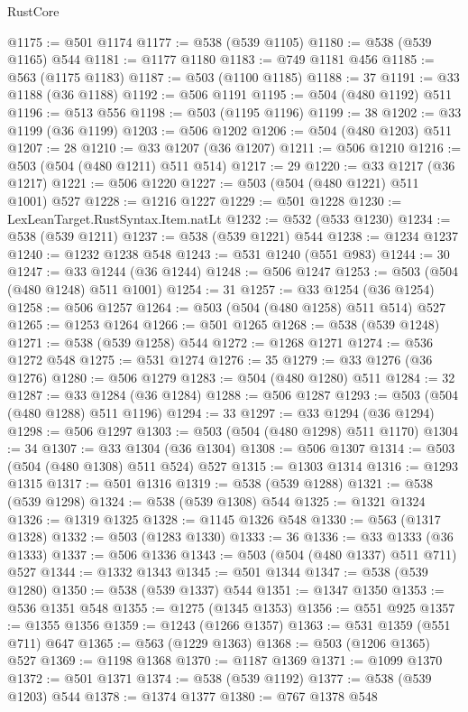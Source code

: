 \begin{lexlean}{RustCore}
\begin{coremodule}
@1175 := @501 @1174
@1177 := @538 (@539 @1105)
@1180 := @538 (@539 @1165) @544
@1181 := @1177 @1180
@1183 := @749 @1181 @456
@1185 := @563 (@1175 @1183)
@1187 := @503 (@1100 @1185)
@1188 := 37
@1191 := @33 @1188 (@36 @1188)
@1192 := @506 @1191
@1195 := @504 (@480 @1192) @511
@1196 := @513 @556
@1198 := @503 (@1195 @1196)
@1199 := 38
@1202 := @33 @1199 (@36 @1199)
@1203 := @506 @1202
@1206 := @504 (@480 @1203) @511
@1207 := 28
@1210 := @33 @1207 (@36 @1207)
@1211 := @506 @1210
@1216 := @503 (@504 (@480 @1211) @511 @514)
@1217 := 29
@1220 := @33 @1217 (@36 @1217)
@1221 := @506 @1220
@1227 := @503 (@504 (@480 @1221) @511 @1001) @527
@1228 := @1216 @1227
@1229 := @501 @1228
@1230 := LexLeanTarget.RustSyntax.Item.natLt
@1232 := @532 (@533 @1230)
@1234 := @538 (@539 @1211)
@1237 := @538 (@539 @1221) @544
@1238 := @1234 @1237
@1240 := @1232 @1238 @548
@1243 := @531 @1240 (@551 @983)
@1244 := 30
@1247 := @33 @1244 (@36 @1244)
@1248 := @506 @1247
@1253 := @503 (@504 (@480 @1248) @511 @1001)
@1254 := 31
@1257 := @33 @1254 (@36 @1254)
@1258 := @506 @1257
@1264 := @503 (@504 (@480 @1258) @511 @514) @527
@1265 := @1253 @1264
@1266 := @501 @1265
@1268 := @538 (@539 @1248)
@1271 := @538 (@539 @1258) @544
@1272 := @1268 @1271
@1274 := @536 @1272 @548
@1275 := @531 @1274
@1276 := 35
@1279 := @33 @1276 (@36 @1276)
@1280 := @506 @1279
@1283 := @504 (@480 @1280) @511
@1284 := 32
@1287 := @33 @1284 (@36 @1284)
@1288 := @506 @1287
@1293 := @503 (@504 (@480 @1288) @511 @1196)
@1294 := 33
@1297 := @33 @1294 (@36 @1294)
@1298 := @506 @1297
@1303 := @503 (@504 (@480 @1298) @511 @1170)
@1304 := 34
@1307 := @33 @1304 (@36 @1304)
@1308 := @506 @1307
@1314 := @503 (@504 (@480 @1308) @511 @524) @527
@1315 := @1303 @1314
@1316 := @1293 @1315
@1317 := @501 @1316
@1319 := @538 (@539 @1288)
@1321 := @538 (@539 @1298)
@1324 := @538 (@539 @1308) @544
@1325 := @1321 @1324
@1326 := @1319 @1325
@1328 := @1145 @1326 @548
@1330 := @563 (@1317 @1328)
@1332 := @503 (@1283 @1330)
@1333 := 36
@1336 := @33 @1333 (@36 @1333)
@1337 := @506 @1336
@1343 := @503 (@504 (@480 @1337) @511 @711) @527
@1344 := @1332 @1343
@1345 := @501 @1344
@1347 := @538 (@539 @1280)
@1350 := @538 (@539 @1337) @544
@1351 := @1347 @1350
@1353 := @536 @1351 @548
@1355 := @1275 (@1345 @1353)
@1356 := @551 @925
@1357 := @1355 @1356
@1359 := @1243 (@1266 @1357)
@1363 := @531 @1359 (@551 @711) @647
@1365 := @563 (@1229 @1363)
@1368 := @503 (@1206 @1365) @527
@1369 := @1198 @1368
@1370 := @1187 @1369
@1371 := @1099 @1370
@1372 := @501 @1371
@1374 := @538 (@539 @1192)
@1377 := @538 (@539 @1203) @544
@1378 := @1374 @1377
@1380 := @767 @1378 @548

\end{coremodule}
\end{lexlean}
